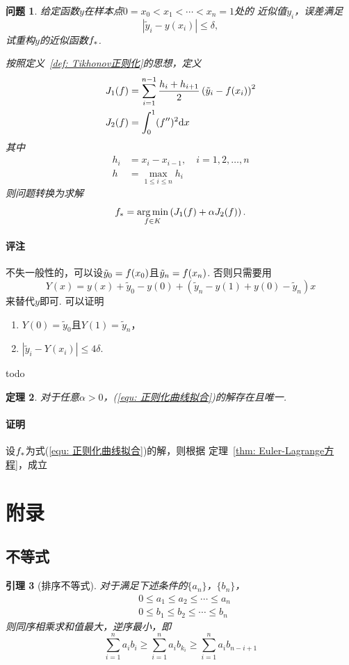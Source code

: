 \documentclass[12pt, a4paper]{article}
\theoremstyle{margin}
\newtheorem{thm}{定理}
\newtheorem{lemma}[thm]{引理}
\newtheorem{prob}[thm]{问题}
\newcommand{\pr}{\prime}
\DeclareMathOperator*{\agm}{arg\,min}
\newcommand{\f}{\mathnormal{f}}
\newcommand{\rd}{\mathrm{d}}
\newcommand\thmref[1]{定理~\ref{#1}}
\newcommand\defref[1]{定义~\ref{#1}}
\newcommand\equref[1]{(\ref{#1})}
\newcommand{\remark}{\paragraph{评注}}
\newcommand{\proof}{\paragraph{证明}}
\begin{document}
  \begin{prob}
    给定函数$y$在样本点$0=x_0 < x_1 < \cdots < x_n = 1$处的
    近似值$\tilde{y}_i$，误差满足
    \[
      |\tilde{y}_i - y(x_i)| \le \delta,
    \]
    试重构$y$的近似函数$\f_*$.\par
    按照\defref{def: Tikhonov正则化}的思想，定义
    \[\begin{split}
      J_1(\f) &= \sum_{i=1}^{n-1}\frac{h_i+h_{i+1}}{2}
      \left( \tilde{y}_i - \f(x_i) \right)^2 \\
      J_2(\f) &= \int_0^1 (\f^{\pr\pr})^2\rd x
    \end{split}\]
    其中
    \[\begin{split}
      h_i &= x_i - x_{i-1},\quad i = 1,2,\dots,n\\
      h &= \max_{1\le i\le n}h_i
    \end{split}\]
    则问题转换为求解
    \begin{equation}
      \label{equ: 正则化曲线拟合}
      \f_* = \agm_{\f\in K}\left( J_1(\f) + \alpha J_2(\f) \right).
    \end{equation}
  \end{prob}
  \remark
    不失一般性的，可以设$\tilde{y}_0 = \f(x_0)$且$\tilde{y}_n=\f(x_n)$.
    否则只需要用
    \[
      Y(x) = y(x)+\tilde{y}_0-y(0)+(\tilde{y}_n-y(1)+y(0)-\tilde{y}_n)x
    \]
    来替代$y$即可. 可以证明
    \begin{enumerate}
      \item $Y(0) = \tilde{y}_0$且$Y(1) = \tilde{y}_n$，
      \item $|\tilde{y}_i - Y(x_i)| \le 4\delta$.
    \end{enumerate}
    todo

  \begin{thm}
    对于任意$\alpha>0$，\equref{equ: 正则化曲线拟合}的解存在且唯一.
  \end{thm}
  \proof
    设$\f_*$为式\equref{equ: 正则化曲线拟合}的解，则根据
    \thmref{thm: Euler-Lagrange方程}，成立



\newpage
\section{附录}
\subsection{不等式}

  \begin{lemma}[排序不等式]
    \label{lemma: 排序不等式}
    对于满足下述条件的$\{a_n\}$，$\{b_n\}$，
    \[\begin{split}
      & 0 \le a_1\le a_2\le\cdots\le a_n \\
      & 0 \le b_1\le b_2\le\cdots\le b_n
    \end{split}\]
    则同序相乘求和值最大，逆序最小，即
    \[
      \sum_{i=1}^n a_ib_i \ge \sum_{i=1}^n a_ib_{k_i}
      \ge \sum_{i=1}^n a_ib_{n-i+1}
    \]
  \end{lemma}
\end{document}
